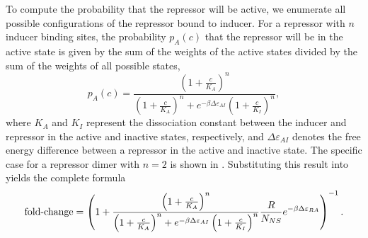 To compute the probability that the repressor will be active, we enumerate all
possible configurations of the repressor bound to inducer. For a repressor with
$n$ inducer binding sites, the probability $p_A(c)$ that the repressor will be
in the active state is given by the sum of the weights of the active states
divided by the sum of the weights of all possible states,
\begin{equation}\label{eq6}
p_A(c)=\frac{\left(1+\frac{c}{K_A}\right)^n}{\left(1+\frac{c}{K_A}\right)^n+e^{-\beta  \Delta \varepsilon_{AI} }\left(1+\frac{c}{K_I}\right)^n},
\end{equation}
where $K_A$ and $K_I$ represent the dissociation constant between the inducer
and repressor in the active and inactive states, respectively, and $\Delta
\varepsilon_{AI}$ denotes the free energy difference between a repressor in the
active and inactive state. The specific case for a repressor dimer with $n=2$ is
shown in \fref[figrepressorInducerStates]. %
Substituting this result into \eref[eq5] yields the
complete formula 
\begin{equation}\label{eq7}
\operatorname{fold-change}= \left(
1+\frac{\left(1+\frac{c}{K_A}\right)^n}{\left(1+\frac{c}{K_A}\right)^n+e^{-\beta  \Delta \varepsilon_{AI} }\left(1+\frac{c}{K_I}\right)^n}\frac{R}{N_{NS}}e^{-\beta \Delta\varepsilon_{RA}} \right)^{-1}.
\end{equation}

